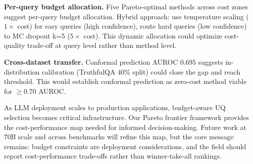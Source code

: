 \textbf{Per-query budget allocation.} Five Pareto-optimal methods across cost zones suggest per-query budget allocation. Hybrid approach: use temperature scaling ($1\times$ cost) for easy queries (high confidence), route hard queries (low confidence) to MC dropout k=5 ($5\times$ cost). This dynamic allocation could optimize cost-quality trade-off at query level rather than method level.

\textbf{Cross-dataset transfer.} Conformal prediction AUROC 0.695 suggests in-distribution calibration (TruthfulQA 40\% split) could close the gap and reach threshold. This would establish conformal prediction as zero-cost method viable for $\geq 0.70$ AUROC.

As LLM deployment scales to production applications, budget-aware UQ selection becomes critical infrastructure. Our Pareto frontier framework provides the cost-performance map needed for informed decision-making. Future work at 70B scale and across benchmarks will refine this map, but the core message remains: budget constraints are deployment considerations, and the field should report cost-performance trade-offs rather than winner-take-all rankings.
